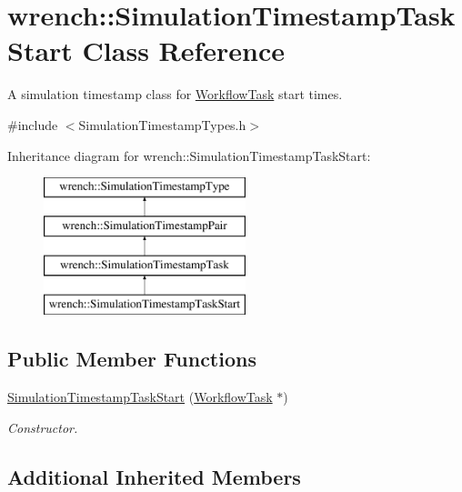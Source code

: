 \hypertarget{classwrench_1_1_simulation_timestamp_task_start}{}\section{wrench\+:\+:Simulation\+Timestamp\+Task\+Start Class Reference}
\label{classwrench_1_1_simulation_timestamp_task_start}


A simulation timestamp class for \hyperlink{classwrench_1_1_workflow_task}{Workflow\+Task} start times.  




{\ttfamily \#include $<$Simulation\+Timestamp\+Types.\+h$>$}

Inheritance diagram for wrench\+:\+:Simulation\+Timestamp\+Task\+Start\+:\begin{figure}[H]
\begin{center}
\leavevmode
\includegraphics[height=4.000000cm]{classwrench_1_1_simulation_timestamp_task_start}
\end{center}
\end{figure}
\subsection*{Public Member Functions}
\begin{DoxyCompactItemize}
\item 
\hyperlink{classwrench_1_1_simulation_timestamp_task_start_a70b133f9ae730b04250a55b8e2c9b036}{Simulation\+Timestamp\+Task\+Start} (\hyperlink{classwrench_1_1_workflow_task}{Workflow\+Task} $\ast$)
\begin{DoxyCompactList}\small\item\em Constructor. \end{DoxyCompactList}\end{DoxyCompactItemize}
\subsection*{Additional Inherited Members}


